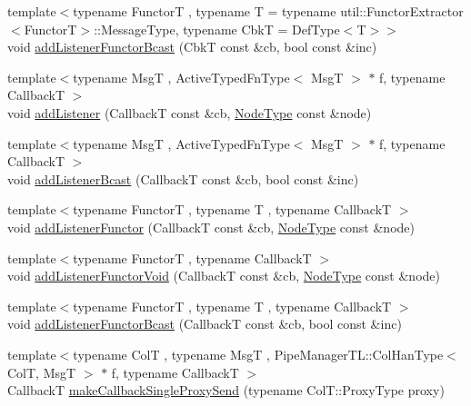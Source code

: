 \begin{DoxyCompactItemize}
\item 
{\footnotesize template$<$typename FunctorT , typename T  = typename util\+::\+Functor\+Extractor$<$\+Functor\+T$>$\+::\+Message\+Type, typename CbkT  = Def\+Type$<$\+T$>$$>$ }\\void \hyperlink{structvt_1_1pipe_1_1_pipe_manager_t_l_a508e6625e15b9315a24af97670468802}{add\+Listener\+Functor\+Bcast} (CbkT const \&cb, bool const \&inc)
\item 
{\footnotesize template$<$typename MsgT , Active\+Typed\+Fn\+Type$<$ Msg\+T $>$ $\ast$ f, typename CallbackT $>$ }\\void \hyperlink{structvt_1_1pipe_1_1_pipe_manager_t_l_ae1aee468ba813cc359e3d3602722b161}{add\+Listener} (CallbackT const \&cb, \hyperlink{namespacevt_a866da9d0efc19c0a1ce79e9e492f47e2}{Node\+Type} const \&node)
\item 
{\footnotesize template$<$typename MsgT , Active\+Typed\+Fn\+Type$<$ Msg\+T $>$ $\ast$ f, typename CallbackT $>$ }\\void \hyperlink{structvt_1_1pipe_1_1_pipe_manager_t_l_a371e41dfb29c097dcf45fa2ae91cbf02}{add\+Listener\+Bcast} (CallbackT const \&cb, bool const \&inc)
\item 
{\footnotesize template$<$typename FunctorT , typename T , typename CallbackT $>$ }\\void \hyperlink{structvt_1_1pipe_1_1_pipe_manager_t_l_aca69c630748b177c01af61b39ffad0ec}{add\+Listener\+Functor} (CallbackT const \&cb, \hyperlink{namespacevt_a866da9d0efc19c0a1ce79e9e492f47e2}{Node\+Type} const \&node)
\item 
{\footnotesize template$<$typename FunctorT , typename CallbackT $>$ }\\void \hyperlink{structvt_1_1pipe_1_1_pipe_manager_t_l_a12039964ec1deb173f0ee83ad4c8a543}{add\+Listener\+Functor\+Void} (CallbackT const \&cb, \hyperlink{namespacevt_a866da9d0efc19c0a1ce79e9e492f47e2}{Node\+Type} const \&node)
\item 
{\footnotesize template$<$typename FunctorT , typename T , typename CallbackT $>$ }\\void \hyperlink{structvt_1_1pipe_1_1_pipe_manager_t_l_a0afd65bacbf65155b3ad095c32aa1038}{add\+Listener\+Functor\+Bcast} (CallbackT const \&cb, bool const \&inc)
\item 
{\footnotesize template$<$typename ColT , typename MsgT , Pipe\+Manager\+T\+L\+::\+Col\+Han\+Type$<$ Col\+T, Msg\+T $>$ $\ast$ f, typename CallbackT $>$ }\\CallbackT \hyperlink{structvt_1_1pipe_1_1_pipe_manager_t_l_a0da1b385495f0a625754f17db45a4066}{make\+Callback\+Single\+Proxy\+Send} (typename Col\+T\+::\+Proxy\+Type proxy)

\end{DoxyCompactItemize}
